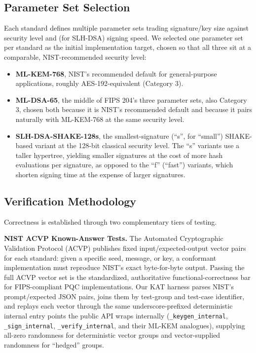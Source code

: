 \documentclass[10pt,conference]{IEEEtran}
\begin{document}
\subsection{Parameter Set Selection}

Each standard defines multiple parameter sets trading signature/key size
against security level and (for SLH-DSA) signing speed. We selected one
parameter set per standard as the initial implementation target, chosen
so that all three sit at a comparable, NIST-recommended security level:

\begin{itemize}
\item \textbf{ML-KEM-768}, NIST's recommended default for general-purpose
  applications, roughly AES-192-equivalent (Category 3).
\item \textbf{ML-DSA-65}, the middle of FIPS 204's three parameter sets,
  also Category 3, chosen both because it is NIST's recommended default
  and because it pairs naturally with ML-KEM-768 at the same security
  level.
\item \textbf{SLH-DSA-SHAKE-128s}, the smallest-signature (``s'', for
  ``small'') SHAKE-based variant at the 128-bit classical security level.
  The ``s'' variants use a taller hypertree, yielding smaller signatures
  at the cost of more hash evaluations per signature, as opposed to the
  ``f'' (``fast'') variants, which shorten signing time at the expense of
  larger signatures.
\end{itemize}

\subsection{Verification Methodology}

Correctness is established through two complementary tiers of testing.

\textbf{NIST ACVP Known-Answer Tests.} The Automated Cryptographic
Validation Protocol (ACVP) \cite{acvp} publishes fixed input/expected-output vector
pairs for each standard: given a specific seed, message, or key, a
conformant implementation must reproduce NIST's exact byte-for-byte
output. Passing the full ACVP vector set is the standardized,
authoritative functional-correctness bar for FIPS-compliant PQC
implementations. Our KAT harness parses NIST's prompt/expected JSON
pairs, joins them by test-group and test-case identifier, and replays
each vector through the same underscore-prefixed deterministic internal
entry points the public API wraps internally (\texttt{\_keygen\_internal},
\texttt{\_sign\_internal}, \texttt{\_verify\_internal}, and their ML-KEM
analogues), supplying all-zero randomness for deterministic vector groups
and vector-supplied randomness for ``hedged'' groups.
\end{document}
